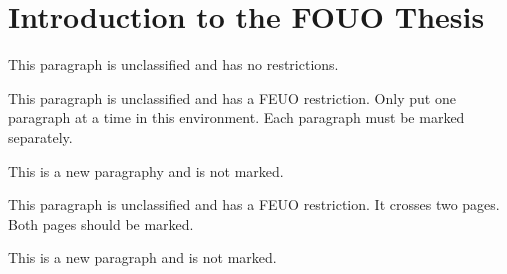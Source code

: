 \chapter{Introduction to the FOUO Thesis}

This paragraph is unclassified and has no restrictions.
\lipsum[2-3] %

\begin{smark}[(FEUO)]
This paragraph is unclassified and has a FEUO restriction.
Only put one paragraph at a time in this environment.
Each paragraph must be marked separately.
\lipsum[4] %
\end{smark}

This is a new paragraphy and is not marked.
\lipsum[3] %

\newpage
\lipsum[1-4] %

\begin{smark}[(FEUO)]
This paragraph is unclassified and has a FEUO restriction.
It crosses two pages. Both pages should be marked.
\lipsum[4] %
\end{smark}


This is a new paragraph and is not marked.
\lipsum[3] %
